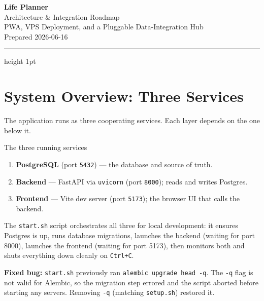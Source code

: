 \documentclass[11pt,a4paper]{article}
\begin{document}
\begin{center}
  {\color{brandDark}\Huge\bfseries Life Planner}\\[0.4em]
  {\color{brand}\LARGE Architecture \& Integration Roadmap}\\[0.8em]
  {\color{muted}\large PWA, VPS Deployment, and a Pluggable Data-Integration Hub}\\[0.6em]
  {\color{muted} Prepared 2026-06-16}
\end{center}

\vspace{0.4em}
\hrule height 1pt
\vspace{1.4em}

\section{System Overview: Three Services}

The application runs as three cooperating services. Each layer depends on the
one below it.

\begin{keybox}{The three running services}
\begin{enumerate}
  \item \textbf{PostgreSQL} (port \texttt{5432}) --- the database and source of truth.
  \item \textbf{Backend} --- FastAPI via \texttt{uvicorn} (port \texttt{8000}); reads and writes Postgres.
  \item \textbf{Frontend} --- Vite dev server (port \texttt{5173}); the browser UI that calls the backend.
\end{enumerate}
\end{keybox}

The \texttt{start.sh} script orchestrates all three for local development:
it ensures Postgres is up, runs database migrations, launches the backend
(waiting for port 8000), launches the frontend (waiting for port 5173), then
monitors both and shuts everything down cleanly on \texttt{Ctrl+C}.

\begin{notebox}
\textbf{Fixed bug:} \texttt{start.sh} previously ran
\texttt{alembic upgrade head -q}. The \texttt{-q} flag is not valid for Alembic,
so the migration step errored and the script aborted before starting any
servers. Removing \texttt{-q} (matching \texttt{setup.sh}) restored it.
\end{notebox}
\end{document}
